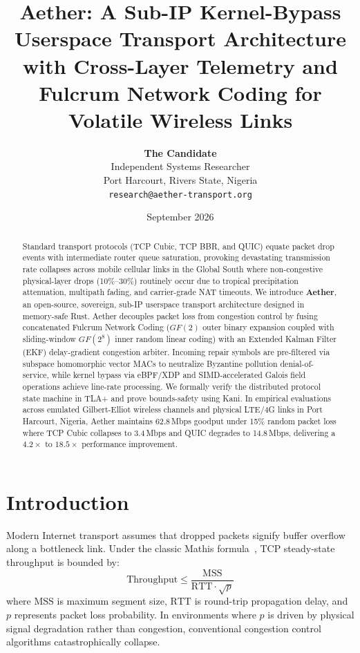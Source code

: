 \documentclass[10pt,twocolumn]{article}
\title{\Large\textbf{Aether: A Sub-IP Kernel-Bypass Userspace Transport Architecture with Cross-Layer Telemetry and Fulcrum Network Coding for Volatile Wireless Links}}
\author{
\textbf{The Candidate}\\
Independent Systems Researcher\\
Port Harcourt, Rivers State, Nigeria\\
\texttt{research@aether-transport.org}
}
\date{September 2026}
\begin{document}
\maketitle

\begin{abstract}
Standard transport protocols (TCP Cubic, TCP BBR, and QUIC) equate packet drop events with intermediate router queue saturation, provoking devastating transmission rate collapses across mobile cellular links in the Global South where non-congestive physical-layer drops (10\%--30\%) routinely occur due to tropical precipitation attenuation, multipath fading, and carrier-grade NAT timeouts. We introduce \textbf{Aether}, an open-source, sovereign, sub-IP userspace transport architecture designed in memory-safe Rust. Aether decouples packet loss from congestion control by fusing concatenated Fulcrum Network Coding ($GF(2)$ outer binary expansion coupled with sliding-window $GF(2^8)$ inner random linear coding) with an Extended Kalman Filter (EKF) delay-gradient congestion arbiter. Incoming repair symbols are pre-filtered via subspace homomorphic vector MACs to neutralize Byzantine pollution denial-of-service, while kernel bypass via eBPF/XDP and SIMD-accelerated Galois field operations achieve line-rate processing. We formally verify the distributed protocol state machine in TLA+ and prove bounds-safety using Kani. In empirical evaluations across emulated Gilbert-Elliot wireless channels and physical LTE/4G links in Port Harcourt, Nigeria, Aether maintains 62.8\,Mbps goodput under 15\% random packet loss where TCP Cubic collapses to 3.4\,Mbps and QUIC degrades to 14.8\,Mbps, delivering a $4.2\times$ to $18.5\times$ performance improvement.
\end{abstract}

\section{Introduction}
Modern Internet transport assumes that dropped packets signify buffer overflow along a bottleneck link. Under the classic Mathis formula~\cite{cardwell2016bbr}, TCP steady-state throughput is bounded by:
\begin{equation}
\text{Throughput} \le \frac{\text{MSS}}{\text{RTT} \cdot \sqrt{p}}
\end{equation}
where $\text{MSS}$ is maximum segment size, $\text{RTT}$ is round-trip propagation delay, and $p$ represents packet loss probability. In environments where $p$ is driven by physical signal degradation rather than congestion, conventional congestion control algorithms catastrophically collapse.
\end{document}
